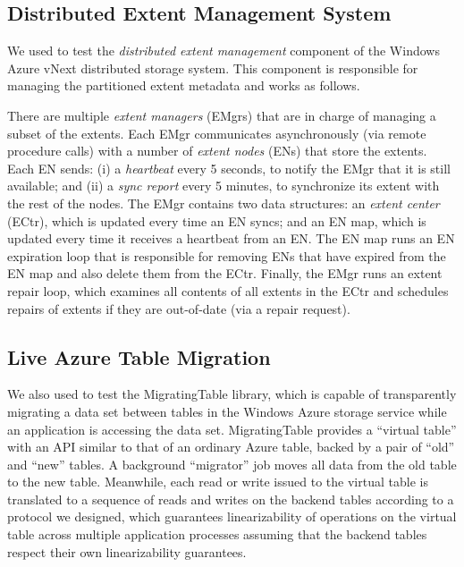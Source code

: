 \subsection{Distributed Extent Management System}
\label{sec:cases:azurestore}

We used \psharp to test the \emph{distributed extent management} component of the Windows Azure vNext distributed storage system. This component is responsible for managing the partitioned extent metadata and works as follows.

There are multiple \emph{extent managers} (EMgrs) that are in charge of managing a subset of the extents. Each EMgr communicates asynchronously (via remote procedure calls) with a number of \emph{extent nodes} (ENs) that store the extents. Each EN sends: (i) a \emph{heartbeat} every 5 seconds, to notify the EMgr that it is still available; and (ii) a \emph{sync report} every 5 minutes, to synchronize its extent with the rest of the nodes. The EMgr contains two data structures: an \emph{extent center} (ECtr), which is updated every time an EN syncs; and an EN map, which is updated every time it receives a heartbeat from an EN. The EN map runs an EN expiration loop that is responsible for removing ENs that have expired from the EN map and also delete them from the ECtr. Finally, the EMgr runs an extent repair loop, which examines all contents of all extents in the ECtr and schedules repairs of extents if they are out-of-date (via a repair request).

\subsection{Live Azure Table Migration}

We also used \psharp to test the MigratingTable library, which is capable of transparently migrating a data set between tables in the Windows Azure storage service while an application is accessing the data set.  MigratingTable provides a ``virtual table'' with an API similar to that of an ordinary Azure table, backed by a pair of ``old'' and ``new''  tables.  A background ``migrator'' job moves all data from the old table to the new table.  Meanwhile, each read or write issued to the virtual table is translated to a sequence of reads and writes on the backend tables according to a protocol we designed, which guarantees linearizability of operations on the virtual table across multiple application processes assuming that the backend tables respect their own linearizability guarantees.

